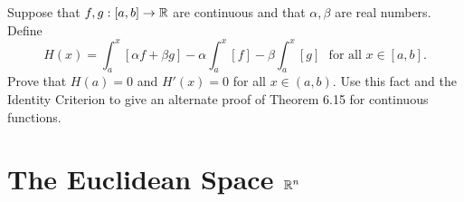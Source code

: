 \documentclass[letterpaper, twoside, 12pt]{book}
\begin{document}
\begin{exercise}[12]
  Suppose that \(f,g:[a,b]\to\mathbb R\) are continuous and that \(\alpha,\beta\)
  are real numbers. Define
  \[
    H(x)
      =
    \int_a^x[\alpha f+\beta g]-\alpha\int_a^x[f]-\beta\int_a^x[g]
    \text{~~for all~} x\in[a,b]
  .\]
  Prove that \(H(a)=0\) and \(H'(x)=0\) for all \(x\in(a,b)\).
  Use this fact and the Identity Criterion to give an alternate proof of
  Theorem 6.15 for continuous functions.
\end{exercise}
\begin{solution}

\end{solution}


\setcounter{chapter}{9}
\chapter{The Euclidean Space \(\mathbb R^n\)}
\end{document}
